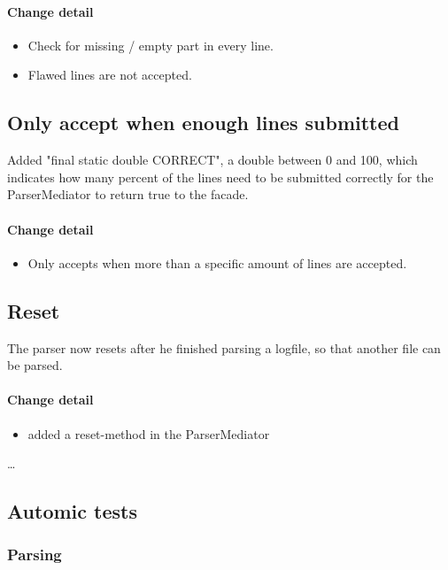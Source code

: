 \paragraph{Change detail}
\begin{itemize}
  \item Check for missing / empty part in every line.
  \item Flawed lines are not accepted.
\end{itemize}

\subsection{Only accept when enough lines submitted}
Added "final static double CORRECT", a double between 0 and 100, which indicates how many percent of the lines need to be
submitted correctly for the ParserMediator to return true to the facade.

\paragraph{Change detail}
\begin{itemize}
  \item Only accepts when more than a specific amount of lines are accepted.
\end{itemize}

\subsection{Reset}
The parser now resets after he finished parsing a logfile, so that another file can be parsed.

\paragraph{Change detail}
\begin{itemize}
  \item added a reset-method in the ParserMediator
\end{itemize}

\ldots 
\subsection{Automic tests}

\subsubsection{Parsing}

